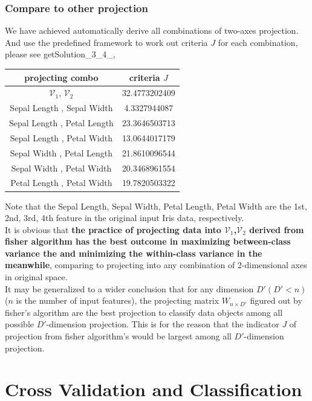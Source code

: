 \documentclass[11pt,a4paper]{article}
\newcommand{\htab}{\hspace*{0.63cm}}
\newcommand{\V}{\mathcal{V}}
\begin{document}
\subsubsection{Compare to other projection}
\htab We have achieved automatically derive all combinations of two-axes projection. And use the predefined framework to work out criteria $J$ for each combination, please see getSolution\_3\_4\_, \\ 
\begin{center}
\begin{tabular} {|| c | c ||}
    \hline 
    projecting combo & criteria $J$ \\ \hline 
    $\V_{1}$, $\V_{2}$ & 32.4773202409 \\ \hline 
    Sepal Length ,  Sepal Width  & 4.3327944087 \\ \hline 
    Sepal Length ,  Petal Length  & 23.3646503713 \\ \hline 
    Sepal Length ,  Petal Width  & 13.0644017179 \\ \hline 
    Sepal Width ,  Petal Length  & 21.8610096544 \\ \hline 
    Sepal Width ,  Petal Width  & 20.3468961554 \\ \hline 
    Petal Length ,  Petal Width  & 19.7820503322 \\ \hline 
\end{tabular}
\end{center}
\htab Note that the Sepal Length,  Sepal Width, Petal Length, Petal Width are the 1st, 2nd, 3rd, 4th feature in the original input Iris data, respectively. \\
\htab It is obvious that \textbf{ the practice of projecting data into $\V_{1}$,$\V_{2}$ derived from fisher algorithm has the best outcome in maximizing between-class variance the and minimizing the within-class variance in the meanwhile}, comparing to projecting into any combination of 2-dimensional axes in original space. \\
\htab It may be generalized to a wider conclusion that for any dimension $D' (D'< n)$ ($n$ is the number of input features),  the projecting matrix $W_{n\times D'}$ figured out by fisher's algorithm are the best projection to classify data objects among all possible $D'$-dimension projection. This is for the reason that the indicator $J$ of projection from fisher algorithm's would be largest among all $D'$-dimension projection.
\newpage

\section{Cross Validation and Classification}
\end{document}
